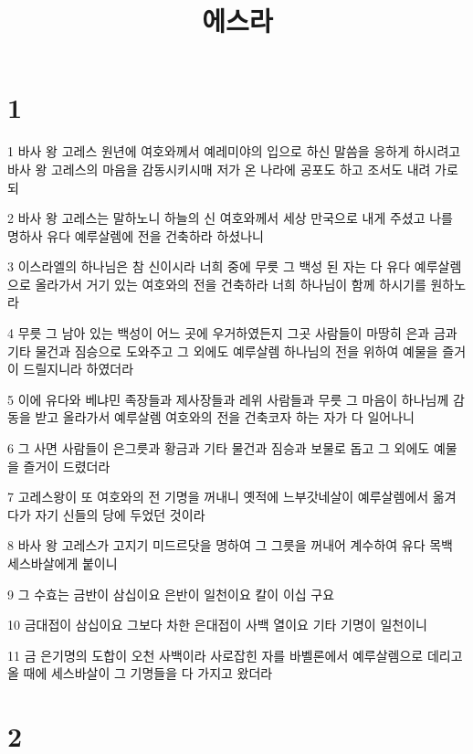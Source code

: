 

\title{에스라}


\chapter{1}

\par 1 바사 왕 고레스 원년에 여호와께서 예레미야의 입으로 하신 말씀을 응하게 하시려고 바사 왕 고레스의 마음을 감동시키시매 저가 온 나라에 공포도 하고 조서도 내려 가로되
\par 2 바사 왕 고레스는 말하노니 하늘의 신 여호와께서 세상 만국으로 내게 주셨고 나를 명하사 유다 예루살렘에 전을 건축하라 하셨나니
\par 3 이스라엘의 하나님은 참 신이시라 너희 중에 무릇 그 백성 된 자는 다 유다 예루살렘으로 올라가서 거기 있는 여호와의 전을 건축하라 너희 하나님이 함께 하시기를 원하노라
\par 4 무릇 그 남아 있는 백성이 어느 곳에 우거하였든지 그곳 사람들이 마땅히 은과 금과 기타 물건과 짐승으로 도와주고 그 외에도 예루살렘 하나님의 전을 위하여 예물을 즐거이 드릴지니라 하였더라
\par 5 이에 유다와 베냐민 족장들과 제사장들과 레위 사람들과 무릇 그 마음이 하나님께 감동을 받고 올라가서 예루살렘 여호와의 전을 건축코자 하는 자가 다 일어나니
\par 6 그 사면 사람들이 은그릇과 황금과 기타 물건과 짐승과 보물로 돕고 그 외에도 예물을 즐거이 드렸더라
\par 7 고레스왕이 또 여호와의 전 기명을 꺼내니 옛적에 느부갓네살이 예루살렘에서 옮겨다가 자기 신들의 당에 두었던 것이라
\par 8 바사 왕 고레스가 고지기 미드르닷을 명하여 그 그릇을 꺼내어 계수하여 유다 목백 세스바살에게 붙이니
\par 9 그 수효는 금반이 삼십이요 은반이 일천이요 칼이 이십 구요
\par 10 금대접이 삼십이요 그보다 차한 은대접이 사백 열이요 기타 기명이 일천이니
\par 11 금 은기명의 도합이 오천 사백이라 사로잡힌 자를 바벨론에서 예루살렘으로 데리고 올 때에 세스바살이 그 기명들을 다 가지고 왔더라

\chapter{2}

